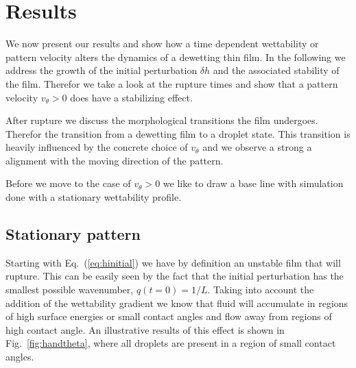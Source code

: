\documentclass[twocolumn,amsmath,amssymb,showpacs,pre,nofootinbib,superscriptaddress]{revtex4-1} %
\begin{document}
\section{Results}\label{sec:results}
We now present our results and show how a time dependent wettability or pattern velocity alters the dynamics of a dewetting thin film.
In the following we address the growth of the initial perturbation $\delta h$ and the associated stability of the film.
Therefor we take a look at the rupture times and show that a pattern velocity $v_{\theta} > 0$ does have a stabilizing effect.

After rupture we discuss the morphological transitions the film undergoes.
Therefor the transition from a dewetting film to a droplet state.
This transition is heavily influenced by the concrete choice of $v_{\theta}$ and we observe a strong a alignment with the moving direction of the pattern.

Before we move to the case of $v_{\theta} > 0$ we like to draw a base line with simulation done with a stationary wettability profile.

\subsection{Stationary pattern}\label{subsec:no_vtheta}
Starting with Eq.~(\ref{eq:hinitial}) we have by definition an unstable film that will rupture.
This can be easily seen by the fact that the initial perturbation has the smallest possible wavenumber, $q(t=0)=1/L$.
Taking into account the addition of the wettability gradient we know that fluid will accumulate in regions of high surface energies or small contact angles and flow away from regions of high contact angle.
An illustrative results of this effect is shown in Fig.~\ref{fig:handtheta}, where all droplets are present in a region of small contact angles.
\end{document}
